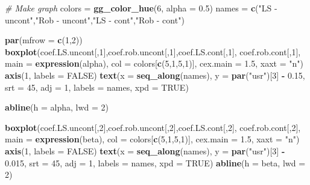 \documentclass[]{book}
\newenvironment{Shaded}{\begin{snugshade}}{\end{snugshade}}
\newcommand{\KeywordTok}[1]{\textcolor[rgb]{0.13,0.29,0.53}{\textbf{#1}}}
\newcommand{\DataTypeTok}[1]{\textcolor[rgb]{0.13,0.29,0.53}{#1}}
\newcommand{\DecValTok}[1]{\textcolor[rgb]{0.00,0.00,0.81}{#1}}
\newcommand{\FloatTok}[1]{\textcolor[rgb]{0.00,0.00,0.81}{#1}}
\newcommand{\StringTok}[1]{\textcolor[rgb]{0.31,0.60,0.02}{#1}}
\newcommand{\CommentTok}[1]{\textcolor[rgb]{0.56,0.35,0.01}{\textit{#1}}}
\newcommand{\OtherTok}[1]{\textcolor[rgb]{0.56,0.35,0.01}{#1}}
\newcommand{\OperatorTok}[1]{\textcolor[rgb]{0.81,0.36,0.00}{\textbf{#1}}}
\newcommand{\NormalTok}[1]{#1}
\theoremstyle{definition}
\theoremstyle{definition}
\theoremstyle{definition}
\theoremstyle{remark}
\begin{document}
\begin{Shaded}
\begin{Highlighting}[]
\CommentTok{# Make graph}
\NormalTok{colors =}\StringTok{ }\KeywordTok{gg_color_hue}\NormalTok{(}\DecValTok{6}\NormalTok{, }\DataTypeTok{alpha =} \FloatTok{0.5}\NormalTok{)}
\NormalTok{names =}\StringTok{ }\KeywordTok{c}\NormalTok{(}\StringTok{"LS - uncont"}\NormalTok{,}\StringTok{"Rob - uncont"}\NormalTok{,}\StringTok{"LS - cont"}\NormalTok{,}\StringTok{"Rob - cont"}\NormalTok{)}

\KeywordTok{par}\NormalTok{(}\DataTypeTok{mfrow =} \KeywordTok{c}\NormalTok{(}\DecValTok{1}\NormalTok{,}\DecValTok{2}\NormalTok{))}
\KeywordTok{boxplot}\NormalTok{(coef.LS.uncont[,}\DecValTok{1}\NormalTok{],coef.rob.uncont[,}\DecValTok{1}\NormalTok{],coef.LS.cont[,}\DecValTok{1}\NormalTok{],}
\NormalTok{        coef.rob.cont[,}\DecValTok{1}\NormalTok{], }\DataTypeTok{main =} \KeywordTok{expression}\NormalTok{(alpha), }
        \DataTypeTok{col =}\NormalTok{ colors[}\KeywordTok{c}\NormalTok{(}\DecValTok{5}\NormalTok{,}\DecValTok{1}\NormalTok{,}\DecValTok{5}\NormalTok{,}\DecValTok{1}\NormalTok{)], }
        \DataTypeTok{cex.main =} \FloatTok{1.5}\NormalTok{, }\DataTypeTok{xaxt =} \StringTok{"n"}\NormalTok{)}
\KeywordTok{axis}\NormalTok{(}\DecValTok{1}\NormalTok{, }\DataTypeTok{labels =} \OtherTok{FALSE}\NormalTok{)}
\KeywordTok{text}\NormalTok{(}\DataTypeTok{x =} \KeywordTok{seq_along}\NormalTok{(names), }\DataTypeTok{y =} \KeywordTok{par}\NormalTok{(}\StringTok{"usr"}\NormalTok{)[}\DecValTok{3}\NormalTok{] }\OperatorTok{-}\StringTok{ }\FloatTok{0.15}\NormalTok{, }\DataTypeTok{srt =} \DecValTok{45}\NormalTok{, }\DataTypeTok{adj =} \DecValTok{1}\NormalTok{,}
     \DataTypeTok{labels =}\NormalTok{ names, }\DataTypeTok{xpd =} \OtherTok{TRUE}\NormalTok{)}

\KeywordTok{abline}\NormalTok{(}\DataTypeTok{h =}\NormalTok{ alpha, }\DataTypeTok{lwd =} \DecValTok{2}\NormalTok{)}

\KeywordTok{boxplot}\NormalTok{(coef.LS.uncont[,}\DecValTok{2}\NormalTok{],coef.rob.uncont[,}\DecValTok{2}\NormalTok{],coef.LS.cont[,}\DecValTok{2}\NormalTok{],}
\NormalTok{        coef.rob.cont[,}\DecValTok{2}\NormalTok{], }\DataTypeTok{main =} \KeywordTok{expression}\NormalTok{(beta), }
        \DataTypeTok{col =}\NormalTok{ colors[}\KeywordTok{c}\NormalTok{(}\DecValTok{5}\NormalTok{,}\DecValTok{1}\NormalTok{,}\DecValTok{5}\NormalTok{,}\DecValTok{1}\NormalTok{)], }
        \DataTypeTok{cex.main =} \FloatTok{1.5}\NormalTok{, }\DataTypeTok{xaxt =} \StringTok{"n"}\NormalTok{)}
\KeywordTok{axis}\NormalTok{(}\DecValTok{1}\NormalTok{, }\DataTypeTok{labels =} \OtherTok{FALSE}\NormalTok{)}
\KeywordTok{text}\NormalTok{(}\DataTypeTok{x =} \KeywordTok{seq_along}\NormalTok{(names), }\DataTypeTok{y =} \KeywordTok{par}\NormalTok{(}\StringTok{"usr"}\NormalTok{)[}\DecValTok{3}\NormalTok{] }\OperatorTok{-}\StringTok{ }\FloatTok{0.015}\NormalTok{, }\DataTypeTok{srt =} \DecValTok{45}\NormalTok{, }\DataTypeTok{adj =} \DecValTok{1}\NormalTok{,}
     \DataTypeTok{labels =}\NormalTok{ names, }\DataTypeTok{xpd =} \OtherTok{TRUE}\NormalTok{)}
\KeywordTok{abline}\NormalTok{(}\DataTypeTok{h =}\NormalTok{ beta, }\DataTypeTok{lwd =} \DecValTok{2}\NormalTok{)}
\end{Highlighting}
\end{Shaded}
\end{document}
